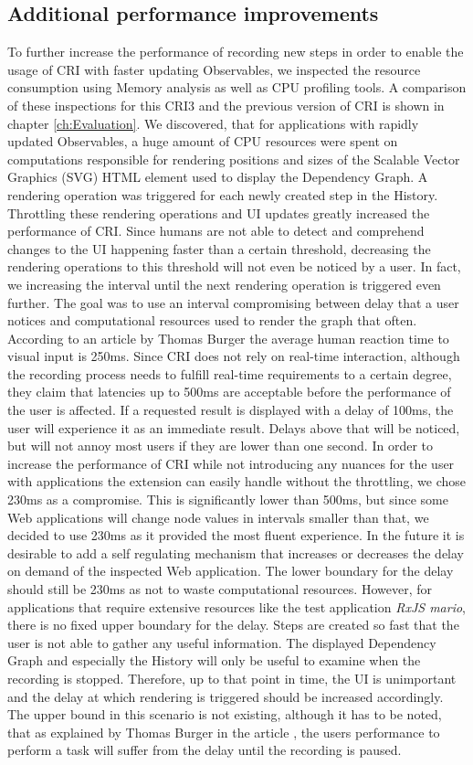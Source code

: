 \subsection{Additional performance improvements}
To further increase the performance of recording new steps in order to enable the usage of CRI with faster updating Observables, we inspected the resource consumption using Memory analysis as well as CPU profiling tools. A comparison of these inspections for this CRI3 and the previous version of CRI is shown in chapter \ref{ch:Evaluation}. We discovered, that for applications with rapidly updated Observables, a huge amount of CPU resources were spent on computations responsible for rendering positions and sizes of the Scalable Vector Graphics (SVG) HTML element used to display the Dependency Graph. A rendering operation was triggered for each newly created step in the History. Throttling these rendering operations and UI updates greatly increased the performance of CRI. Since humans are not able to detect and comprehend changes to the UI happening faster than a certain threshold, decreasing the rendering operations to this threshold will not even be noticed by a user. In fact, we increasing the interval until the next rendering operation is triggered even further. The goal was to use an interval compromising between delay that a user notices and computational resources used to render the graph that often. According to an article by Thomas Burger \cite{Perception} the average human reaction time to visual input is 250ms. Since CRI does not rely on real-time interaction, although the recording process needs to fulfill real-time requirements to a certain degree, they claim that latencies up to 500ms are acceptable before the performance of the user is affected. If a requested result is displayed with a delay of 100ms, the user will experience it as an immediate result. Delays above that will be noticed, but will not annoy most users if they are lower than one second. In order to increase the performance of CRI while not introducing any nuances for the user with applications the extension can easily handle without the throttling, we chose 230ms as a compromise. This is significantly lower than 500ms, but since some Web applications will change node values in intervals smaller than that, we decided to use 230ms as it provided the most fluent experience. In the future it is desirable to add a self regulating mechanism that increases or decreases the delay on demand of the inspected Web application. The lower boundary for the delay should still be 230ms as not to waste computational resources. However, for applications that require extensive resources like the test application \emph{RxJS mario}, there is no fixed upper boundary for the delay. Steps are created so fast that the user is not able to gather any useful information. The displayed Dependency Graph and especially the History will only be useful to examine when the recording is stopped. Therefore, up to that point in time, the UI is unimportant and the delay at which rendering is triggered should be increased accordingly. The upper bound in this scenario is not existing, although it has to be noted, that as explained by Thomas Burger in the article \cite{Perception}, the users performance to perform a task will suffer from the delay until the recording is paused.
